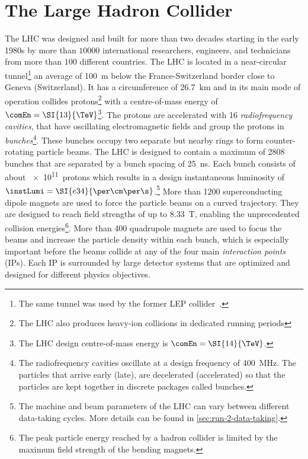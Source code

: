 \section{The Large Hadron Collider}
The LHC was designed and built for more than two decades starting in the early 1980s by more than $10000$ international researchers, engineers, and technicians from more than $100$ different countries.
The LHC is located in a near-circular tunnel\footnote{The same tunnel was used by the former LEP collider~\cite{LEPDesignReport}.} an average of \SI{100}{\m} below the France-Switzerland border close to Geneva (Switzerland). It has a circumference of \SI{26.7}{\km} and in its main mode of operation collides protons\footnote{The LHC also produces heavy-ion collisions in dedicated running periods} with a centre-of-mass energy of $\comEn = \SI{13}{\TeV}$\footnote{The LHC design centre-of-mass energy is $\comEn = \SI{14}{\TeV}$.}.
The protons are accelerated with 16 \emph{radiofrequency cavities}, that have oscillating electromagnetic fields and group the protons in \emph{bunches}\footnote{The radiofrequency cavities oscillate at a design frequency of \SI{400}{\mega\hertz}. The particles that arrive early (late), are decelerated (accelerated) so that the particles are kept together in discrete packages called bunches.}.
These bunches occupy two separate but nearby rings to form counter-rotating particle beams.
The LHC is designed to contain a maximum of 2808 bunches that are separated by a bunch spacing of \SI{25}{\ns}. Each bunch consists of about \SI{e11}{protons} which results in a design instantaneous luminosity of $\instLumi = \SI{e34}{\per\cm\per\s}$.\footnote{The machine and beam parameters of the LHC can vary between different data-taking cycles. More details can be found in \cref{sec:run-2-data-taking}.}
More than 1200 superconducting dipole magnets are used to force the particle beams on a curved trajectory.
They are designed to reach field strengths of up to \SI{8.33}{\tesla}, enabling the unprecedented collision energies\footnote{The peak particle energy reached by a hadron collider is limited by the maximum field strength of the bending magnets.}. More than 400 quadrupole magnets are used to focus the beams and increase the particle density within each bunch, which is especially important before the beams collide at any of the four main \emph{interaction points} (IPs). Each IP is surrounded by large detector systems that are optimized and designed for different physics objectives.
